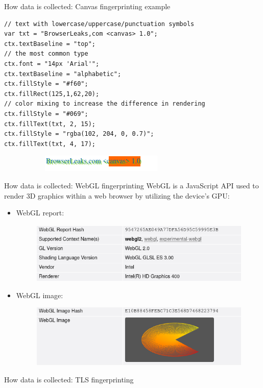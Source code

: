 \begin{frame}[fragile]{How data is collected: Canvas fingerprinting example}
  \begin{verbatim}
// text with lowercase/uppercase/punctuation symbols
var txt = "BrowserLeaks,com <canvas> 1.0";
ctx.textBaseline = "top";
// the most common type
ctx.font = "14px 'Arial'";
ctx.textBaseline = "alphabetic";
ctx.fillStyle = "#f60";
ctx.fillRect(125,1,62,20);
// color mixing to increase the difference in rendering
ctx.fillStyle = "#069";
ctx.fillText(txt, 2, 15);
ctx.fillStyle = "rgba(102, 204, 0, 0.7)";
ctx.fillText(txt, 4, 17);
  \end{verbatim}

  \begin{figure}
    \centering
    \begin{subfigure}{0.45\textwidth}
      \includegraphics[width=\linewidth]{images/canvas.png}
    \end{subfigure}
    \begin{subfigure}{0.45\textwidth}
    \end{subfigure}
  \end{figure}
\end{frame}

\begin{frame}{How data is collected: WebGL fingerprinting}
  WebGL is a JavaScript API used to render 3D graphics within a web browser by utilizing the device's GPU:
  \begin{itemize}
    \item WebGL report:
          \begin{figure}
            \centering
            \includegraphics[width=\linewidth, scale=0.9]{images/webgl-report.png}
          \end{figure}
    \item WebGL image:
          \begin{figure}
            \centering
            \includegraphics[width=\linewidth, scale=0.9]{images/webgl-image.png}
          \end{figure}
  \end{itemize}
\end{frame}

\begin{frame}{How data is collected: TLS fingerprinting}

\end{frame}